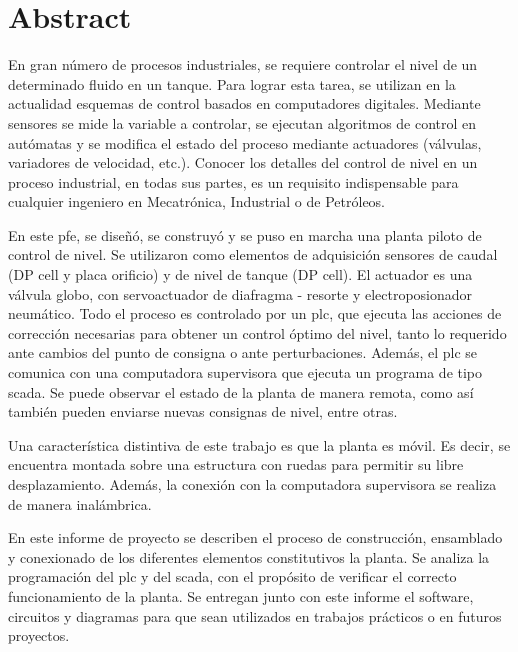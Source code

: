 \markboth{}{}
\pagestyle{empty}

\chapter*{Abstract}

En gran número de procesos industriales, se requiere controlar el
nivel de un determinado fluido en un tanque.
Para lograr esta tarea, se utilizan en la actualidad esquemas de control
basados en computadores digitales.
Mediante sensores se mide la variable a
controlar, se ejecutan algoritmos de control en autómatas y se
modifica el estado del proceso mediante actuadores (válvulas, variadores de
velocidad, etc.).
Conocer los detalles del control de nivel en un proceso industrial, en todas sus
partes, es un requisito
indispensable para cualquier ingeniero en Mecatrónica, Industrial o de
Petróleos.

En este \gls{pfe}, se diseñó, se construyó y se puso en marcha una planta
piloto de control de nivel.
Se utilizaron como elementos de adquisición sensores de caudal (DP cell y placa
orificio) y de nivel de tanque (DP cell).
El actuador es una válvula globo, con servoactuador de diafragma -
resorte y electroposionador neumático.
Todo el proceso es controlado por un \gls{plc},
que ejecuta las acciones de
corrección necesarias para obtener un control óptimo del nivel, tanto lo
requerido ante cambios del punto de consigna o ante perturbaciones.
Además, el \gls{plc} se comunica con una computadora supervisora que ejecuta
un programa de tipo \gls{scada}.
Se puede observar el estado de la
planta de manera remota, como así también pueden enviarse nuevas consignas de
nivel,
entre otras.

Una característica distintiva de este trabajo es que la planta es móvil.
Es decir, se encuentra montada sobre una estructura con ruedas para permitir su
libre desplazamiento.
Además, la conexión con la computadora supervisora se realiza de manera
inalámbrica.

En este informe de proyecto se describen el proceso de construcción,
ensamblado y conexionado de los diferentes elementos constitutivos la planta.
Se analiza la programación del \gls{plc} y del \gls{scada}, con el
propósito de verificar el correcto funcionamiento de la planta.
Se entregan junto con este informe el software, circuitos y diagramas para
que sean utilizados en trabajos prácticos o en futuros proyectos.

